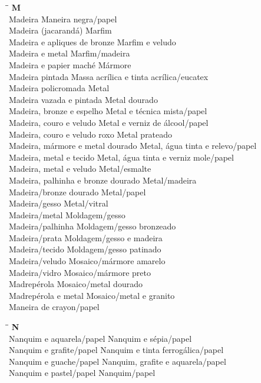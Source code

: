 \begin{tabbing}
	\hspace{8,7cm}\=\hspace{1cm}\=\kill
	\textbf{M} \>  \\ 
	Madeira	\> Maneira negra/papel\\
	Madeira (jacarandá) \> Marfim\\
	Madeira e apliques de bronze \> Marfim e veludo \\	
	Madeira e metal \> Marfim/madeira\\
	Madeira e papier maché \> Mármore\\
	Madeira pintada \> Massa acrílica e tinta acrílica/eucatex\\
	Madeira policromada \> Metal \\	
	Madeira vazada e pintada \> Metal dourado\\   
	Madeira, bronze e espelho	\> Metal e técnica mista/papel\\
	Madeira, couro e veludo \> Metal e verniz de álcool/papel\\
	Madeira, couro e veludo roxo \> Metal prateado \\	
	Madeira, mármore e metal dourado \> Metal, água tinta e relevo/papel\\ 
	Madeira, metal e tecido \> Metal, água tinta e verniz mole/papel \\	
	Madeira, metal e veludo \> Metal/esmalte\\
	Madeira, palhinha e bronze dourado \> Metal/madeira \\	
	Madeira/bronze dourado \> Metal/papel\\
	Madeira/gesso \> Metal/vitral\\
	Madeira/metal \> Moldagem/gesso\\
	Madeira/palhinha \> Moldagem/gesso bronzeado \\	
	Madeira/prata \> Moldagem/gesso e madeira\\   
	Madeira/tecido	\> Moldagem/gesso patinado\\
	Madeira/veludo \> Mosaico/mármore amarelo\\
	Madeira/vidro \> Mosaico/mármore preto \\	
	Madrepérola \> Mosaico/metal dourado\\ 
	Madrepérola e metal \> Mosaico/metal e granito \\	
	Maneira de crayon/papel \> \\        
\end{tabbing}

\begin{tabbing}
	\hspace{8,7cm}\=\hspace{1cm}\=\kill
	\textbf{N} \>  \\ 
	Nanquim e aquarela/papel	\> Nanquim e sépia/papel\\
	Nanquim e grafite/papel \> Nanquim e tinta ferrogálica/papel\\
	Nanquim e guache/papel \> Nanquim, grafite e aquarela/papel \\	
	Nanquim e pastel/papel \> Nanquim/papel\\
\end{tabbing}

